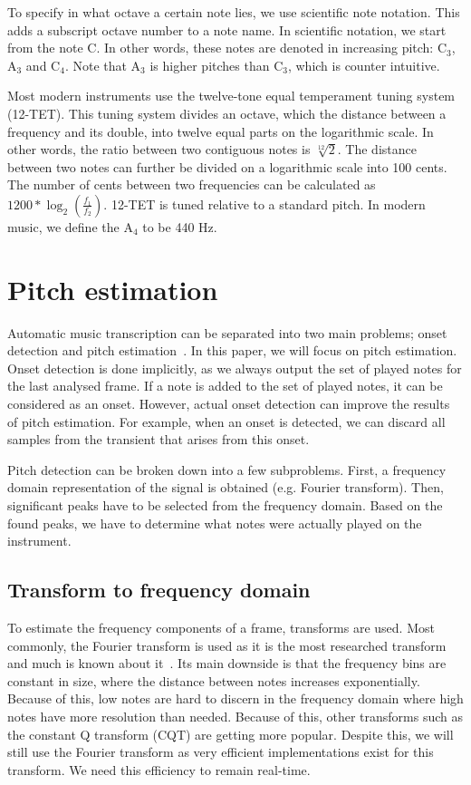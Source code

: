 \documentclass[10pt,twocolumn]{article}
\begin{document}
To specify in what octave a certain note lies, we use scientific note notation. This adds a subscript octave number to a note name. In scientific notation, we start from the note C. In other words, these notes are denoted in increasing pitch: $\text{C}_3$, $\text{A}_3$ and $\text{C}_4$. Note that $\text{A}_3$ is higher pitches than $\text{C}_3$, which is counter intuitive.

Most modern instruments use the twelve-tone equal temperament tuning system (12-TET). This tuning system divides an octave, which the distance between a frequency and its double, into twelve equal parts on the logarithmic scale. In other words, the ratio between two contiguous notes is $\sqrt[12]{2}$. The distance between two notes can further be divided on a logarithmic scale into 100 cents. The number of cents between two frequencies can be calculated as $1200 * \log_2(\frac{f_1}{f_2})$. 12-TET is tuned relative to a standard pitch. In modern music, we define the $\text{A}_4$ to be 440 Hz.


\section{Pitch estimation}
Automatic music transcription can be separated into two main problems; onset detection and pitch estimation~\cite{survey2}. In this paper, we will focus on pitch estimation. Onset detection is done implicitly, as we always output the set of played notes for the last analysed frame. If a note is added to the set of played notes, it can be considered as an onset. However, actual onset detection can improve the results of pitch estimation. For example, when an onset is detected, we can discard all samples from the transient that arises from this onset.

Pitch detection can be broken down into a few subproblems. First, a frequency domain representation of the signal is obtained (e.g. Fourier transform). Then, significant peaks have to be selected from the frequency domain. Based on the found peaks, we have to determine what notes were actually played on the instrument.

\subsection{Transform to frequency domain}
To estimate the frequency components of a frame, transforms are used. Most commonly, the Fourier transform is used as it is the most researched transform and much is known about it~\cite{survey2}. Its main downside is that the frequency bins are constant in size, where the distance between notes increases exponentially. Because of this, low notes are hard to discern in the frequency domain where high notes have more resolution than needed. Because of this, other transforms such as the constant Q transform (CQT) are getting more popular. Despite this, we will still use the Fourier transform as very efficient implementations exist for this transform. We need this efficiency to remain real-time.
\end{document}
